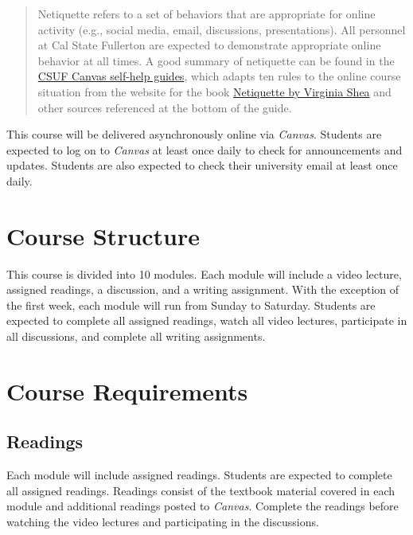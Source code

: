 \documentclass[11pt, letterpaper]{article}
\begin{document}
\begin{quote}Netiquette refers to a set of behaviors that are appropriate for online activity (e.g., social media, email, discussions, presentations). All personnel at Cal State Fullerton are expected to demonstrate appropriate online behavior at all times. A good summary of netiquette can be found in the \href{https://canvashelp.fullerton.edu/m/Student/l/1336786-student-what-is-netiquette}{CSUF Canvas self-help guides}, which adapts ten rules to the online course situation from the website for the book \href{http://www.albion.com/netiquette/corerules.html}{Netiquette by Virginia Shea} and other sources referenced at the bottom of the guide.\end{quote}

\noindent This course will be delivered asynchronously online via \emph{Canvas}. Students are expected to log on to \emph{Canvas} at least once daily to check for announcements and updates. Students are also expected to check their university email at least once daily.

\section{Course Structure}

This course is divided into 10 modules. Each module will include a video lecture, assigned readings, a discussion, and a writing assignment. With the exception of the first week, each module will run from Sunday to Saturday. Students are expected to complete all assigned readings, watch all video lectures, participate in all discussions, and complete all writing assignments.

\section*{Course Requirements}

\subsection*{Readings}

Each module will include assigned readings. Students are expected to complete all assigned readings. Readings consist of the textbook material covered in each module and additional readings posted to \emph{Canvas}. Complete the readings before watching the video lectures and participating in the discussions.
\end{document}
